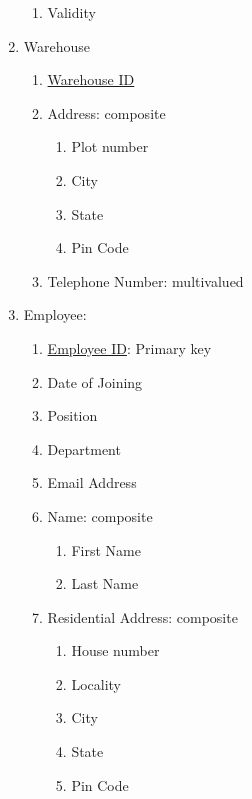 \documentclass[12pt]{report}
\begin{document}
\begin{enumerate}
\begin{enumerate}
                \item Validity
            \end{enumerate}
        \item Warehouse
            \begin{enumerate}
                \item \underline{Warehouse ID}
                \item Address: composite
                    \begin{enumerate}
                        \item Plot number
                        \item City
                        \item State
                        \item Pin Code
                    \end{enumerate}
                \item Telephone Number: multivalued
            \end{enumerate}
        \item Employee:
            \begin{enumerate}
                \item \underline{Employee ID}: Primary key
                \item Date of Joining
                \item Position
                \item Department
                \item Email Address
                \item Name: composite
                    \begin{enumerate}
                        \item First Name
                        \item Last Name
                    \end{enumerate}
                \item Residential Address: composite
                    \begin{enumerate}
                        \item House number
                        \item Locality
                        \item City
                        \item State
                        \item Pin Code
                    \end{enumerate}

\end{enumerate}
\end{enumerate}
\end{document}
